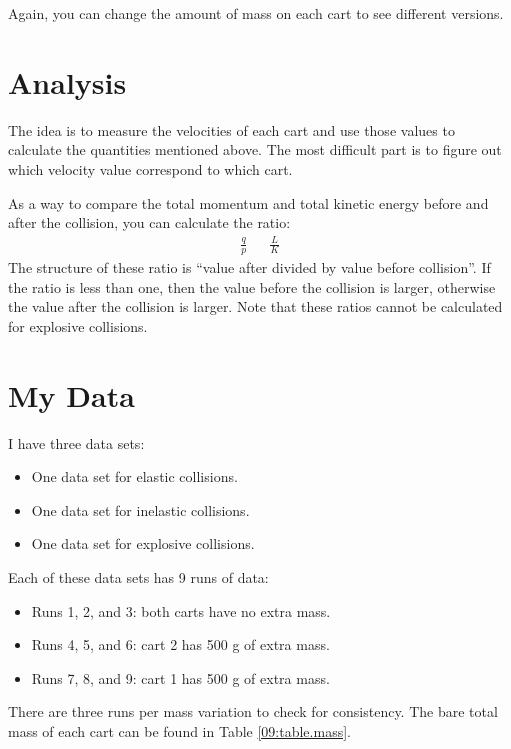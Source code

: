 Again, you can change the amount of mass on each cart to see different versions.
%
\section{Analysis}
%
The idea is to measure the velocities of each cart and use those values to calculate the quantities mentioned above. The most difficult part is to figure out which velocity value correspond to which cart.

As a way to compare the total momentum and total kinetic energy before and after the collision, you can calculate the ratio:
\begin{align}
    \frac{q}{p} && \frac{L}{K}
\end{align}
The structure of these ratio is ``value after divided by value before collision''. If the ratio is less than one, then the value before the collision is larger, otherwise the value after the collision is larger. Note that these ratios cannot be calculated for explosive collisions.
%
\section{My Data}
%
I have three data sets:
\begin{itemize}
    \item One data set for elastic collisions.
    \item One data set for inelastic collisions.
    \item One data set for explosive collisions.
\end{itemize}
Each of these data sets has 9 runs of data:
\begin{itemize}
    \item Runs 1, 2, and 3: both carts have no extra mass.
    \item Runs 4, 5, and 6: cart 2 has 500 g of extra mass.
    \item Runs 7, 8, and 9: cart 1 has 500 g of extra mass.
\end{itemize}
There are three runs per mass variation to check for consistency. The bare total mass of each cart can be found in Table \ref{09:table.mass}.
%
